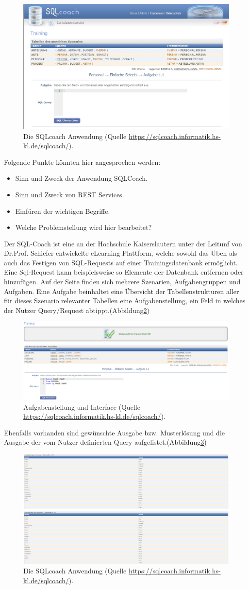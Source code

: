 \documentclass[fleqn,10pt,ngerman]{SelfArx}
\begin{document}
	\begin{figure}[ht]\centering
		\includegraphics[width=5 cm]{Abbildungen/sqlcoach.jpg}
		\caption{Die SQLcoach Anwendung (Quelle \url{https://sqlcoach.informatik.hs-kl.de/sqlcoach/}).}
		\label{fig:fsm1}
	\end{figure}
	
	Folgende Punkte könnten hier angesprochen werden:
	\begin{itemize}[noitemsep]
		\item Sinn und Zweck der Anwendung SQLCoach.
		\item Sinn und Zweck von REST Services.
		\item Einf\"uren der wichtigen Begriffe.
		\item Welche Problemstellung wird hier bearbeitet?
	\end{itemize}
	Der SQL-Coach ist eine an der Hochschule Kaiserslautern unter der Leitunf von Dr.Prof. Schiefer entwickelte eLearning Plattform, welche sowohl das Üben als auch das Festigen von SQL-Requests auf einer Trainingsdatenbank ermöglicht. Eine Sql-Request kann beispielsweise so Elemente der Datenbank entfernen oder hinzufügen. Auf der Seite finden sich mehrere Szenarien, Aufgabengruppen und Aufgaben. 
	Eine Aufgabe beinhaltet eine Übersicht der Tabellenstrukturen aller für dieses Szenario relevanter Tabellen eine Aufgabenstellung, ein Feld in welches der Nutzer  Query/Request abtippt.(Abbildung\ref{fig:fsm2})
		\begin{figure}[ht]\centering
		\includegraphics[width=5 cm]{Abbildungen/SQL_Coach_Aufgabe}
		\caption{Aufgabenstellung und Interface (Quelle \url{https://sqlcoach.informatik.hs-kl.de/sqlcoach/}).}
		\label{fig:fsm2}
	\end{figure}
\newline
	Ebenfalls vorhanden sind  gewünschte Ausgabe bzw. Musterlösung und die Ausgabe der vom Nutzer definierten Query aufgelistet.(Abbildung\ref{fig:fsml3})
	\begin{figure}[ht]\centering
		\includegraphics[width=5 cm]{Abbildungen/TabellenBild}
		\caption{Die SQLcoach Anwendung (Quelle \url{https://sqlcoach.informatik.hs-kl.de/sqlcoach/}).}
		\label{fig:fsml3}
	\end{figure}
	
\end{document}
